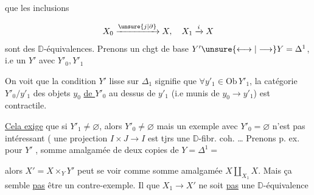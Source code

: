 
que les inclusions

\[
X_0\xrightarrow{\unsure{j|\partial}}X,\quad X_1\xrightarrow{i}X
\]
sont des $\mathbb D$-équivalences. Prenons un chgt de base $Y'\unsure{\longleftrightarrow|\longrightarrow}Y=\Delta^1$, i.e un $Y'$ avec $Y'_0,Y'_1$

On voit que la condition $Y'$ lisse sur $\Delta_1$ signifie que $\forall y'_1\in\mathrm{Ob}\,Y'_1$, la catégorie $Y'_0/y'_1$ des objets $y_0$ \uline{de $Y'_0$} au dessus de $y'_1$ (i.e munis de $y_0\longrightarrow y'_1$) est contractile.

\margin{$\longrightarrow$}

\uline{Cela exige} que si $Y'_1\ne\varnothing$,  alors $Y'_0\ne\varnothing$ \unsure{---|$=$} mais un exemple avec $Y'_0=\varnothing$  n'est pas intéressant (  une projection $I\times J\longrightarrow I$ est tjrs  une $\mathbb D$-fibr. coh. \ldots{}  Prenons p. ex. pour $Y'$
, somme amalgamée de deux copies de $Y=\Delta^1=$

alors $X'=X\times_Y Y'$ peut se voir comme somme amalgamée $X\amalg_{X_1}X$. Mais ça semble \uline{pas} être un contre-exemple.  Il  que $X_1\longrightarrow X'$ ne soit \uline{pas} une $\mathbb D$-équivalence
